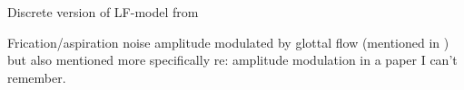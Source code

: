 Discrete version of LF-model from \cite{Li2011}

Frication/aspiration noise amplitude modulated by glottal flow (mentioned in \cite{Johnson2003}) but also mentioned more specifically re: amplitude modulation in a paper I can't remember.